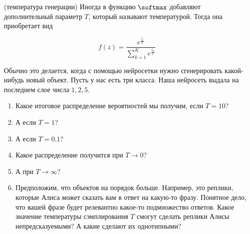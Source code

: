 


\begin{problem}{(температура генерации)}
	Иногда в функцию $\softmax$ добавляют дополнительный параметр $T$, который называют температурой. Тогда она приобретает вид 
	
	$$ 
	f(z) =  \frac{e^{\tfrac{z_i}{T}}}{ \sum_{k=1}^K e^{\tfrac{z_k}{T}}}
	$$

	Обычно это делается, когда с помощью нейросетки нужно сгенерировать какой-нибудь новый объект.  Пусть у нас есть три класса. Наша нейросеть выдала на последнем слое числа $1,2,5$. 

	\begin{enumerate}
		\item  Какое итоговое распределение вероятностей мы получим, если $T = 10$? 
		\item  А если $T = 1$? 
		\item  А если $T = 0.1$? 
		\item  Какое распределение получится при $T \to 0$? 
		\item  А при $T \to \infty$? 
		\item  Предположим, что объектов на порядок больше. Например, это реплики, которые Алиса может сказать вам в ответ на какую-то фразу.  Понятное дело, что вашей фразе будет релевантно какое-то подмножество ответов. Какое значение температуры сэмплирования $T$ смогут сделать реплики Алисы непредсказуемыми? А какие сделают их однотипными? 
	\end{enumerate}
\end{problem}

